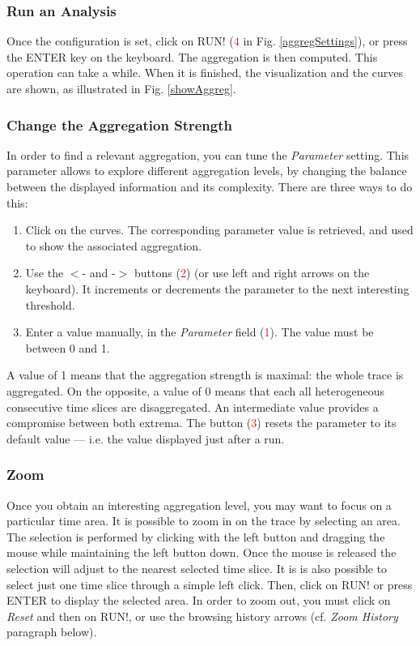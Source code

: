 \documentclass[twoside]{article}
\begin{document}
\begin{sloppypar}
\subsubsection{Run an Analysis}
Once the configuration is set, click on RUN! (\textcolor{red}{4} in Fig. \ref{aggregSettings}), or press the ENTER key on the keyboard. The aggregation is then computed. This operation can take a while. When it is finished, the visualization and the curves are shown, as illustrated in Fig. \ref{showAggreg}.

\subsubsection{Change the Aggregation Strength}
In order to find a relevant aggregation, you can tune the \textit{Parameter} setting. This parameter allows to explore different aggregation levels, by changing the balance between the displayed information and its complexity. There are three ways to do this:
\begin{enumerate}
	\item Click on the curves. The corresponding parameter value is retrieved, and used to show the associated aggregation.
	\item Use the $<$- and -$>$ buttons (\textcolor{red}{2}) (or use left and right arrows on the keyboard). It increments or decrements the parameter to the next interesting threshold.
	\item Enter a value manually, in the \textit{Parameter} field (\textcolor{red}{1}). The value must be between 0 and 1.
\end{enumerate}
A value of 1 means that the aggregation strength is maximal: the whole trace is aggregated. On the opposite, a value of 0 means that each all heterogeneous consecutive time slices are disaggregated. An intermediate value provides a compromise between both extrema. The button (\textcolor{red}{3}) resets the parameter to its default value --- i.e. the value displayed just after a run.

\subsubsection{Zoom}
Once you obtain an interesting aggregation level, you may want to focus on a particular time area. It is possible to zoom in on the trace by selecting an area. The selection is performed by clicking with the left button and dragging the mouse while maintaining the left button down. Once the mouse is released the selection will adjust to the nearest selected time slice. It is is also possible to select just one time slice through a simple left click. Then, click on RUN! or press ENTER to display the selected area. In order to zoom out, you must click on \textit{Reset} and then on RUN!, or use the browsing history arrows (cf. \emph{Zoom History} paragraph below).


\end{sloppypar}
\end{document}
